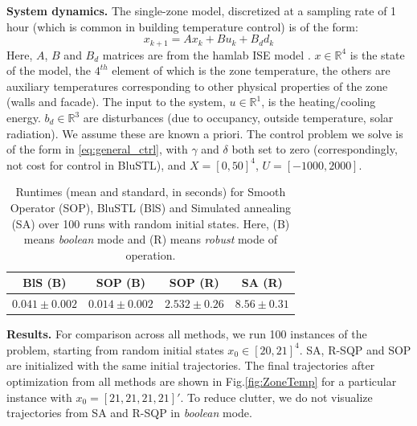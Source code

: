 \textbf{System dynamics.} The single-zone model, discretized at a sampling rate of 1 hour (which is common in building temperature control) is of the form:
\begin{equation}
\label{eq:bldg_dyn}
x_{k+1} = Ax_{k}+Bu_k+B_dd_k
\end{equation}
Here, $A$, $B$ and $B_d$ matrices are from the hamlab ISE model \cite{VanSchijndel2005}. $x \in \mathbb{R}^4$ is the state of the model, the $4^{th}$ element of which is the zone temperature, the others are auxiliary temperatures corresponding to other physical properties of the zone (walls and facade). The input to the system, $u \in \mathbb{R}^1$, is the heating/cooling energy. $b_d \in \mathbb{R}^3$ are disturbances (due to occupancy, outside temperature, solar radiation). We assume these are known a priori.
The control problem we solve is of the form in \eqref{eq:general_ctrl}, with $\gamma$ and $\delta$ both set to zero (correspondingly, not cost for control in BluSTL), and $X=[0,50]^4$, $U=[-1000,2000]$.

\begin{table}[tb]
\small
\begin{center}
\caption{{\small Runtimes (mean and standard, in seconds) for Smooth Operator (SOP), BluSTL (BlS) and Simulated annealing (SA) over 100 runs with random initial states. Here, (B) means \textit{boolean} mode and (R) means \textit{robust} mode of operation.}}
\vspace{-5pt}
\label{tbl:time_performance_bldg}
\begin{tabular} {|c|c|c|c|}
	\hline
	BlS (B) & SOP (B) & SOP (R) & SA (R) \\ \hline
	 $0.041 \pm 0.002$ &  $\mathbf{0.014 \pm 0.002}$  &  $2.532 \pm 0.26$ & $8.56 \pm 0.31$ \\ \hline 
\end{tabular}	
\end{center}
\end{table}



\textbf{Results.} For comparison across all methods, we run 100 instances of the problem, starting from random initial states $x_0 \in [20,21]^4$. SA, R-SQP and SOP are initialized with the same initial trajectories. The final trajectories after optimization from all methods are shown in Fig.\ref{fig:ZoneTemp} for a particular instance with $x_0 = [21,21,21,21]'$. To reduce clutter, we do not visualize trajectories from SA and R-SQP in \textit{boolean} mode. 

